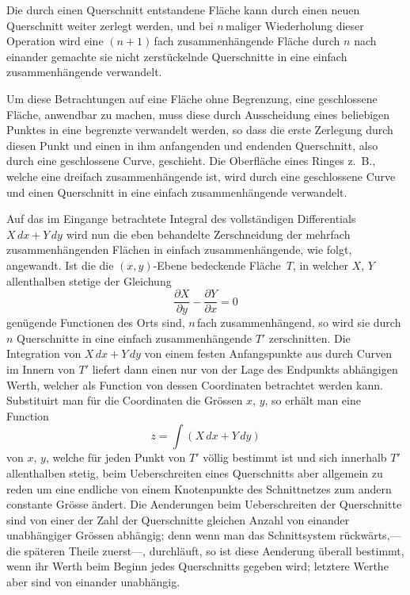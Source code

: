 \documentclass[a4paper,12pt,leqno]{article}
\begin{document}
Die durch einen Querschnitt entstandene Fl\"{a}che kann durch
einen neuen Querschnitt weiter zerlegt werden, und bei $n \,$\-maliger
Wiederholung dieser Operation wird eine ${(n + 1)} \,$\-fach
zusammenh\"{a}ngende Fl\"{a}che durch $n$ nach einander gemachte
sie nicht zerst\"{u}ckelnde Querschnitte in eine einfach
zusammenh\"{a}ngende verwandelt.

Um diese Betrachtungen auf eine Fl\"{a}che ohne Begrenzung, eine
geschlossene Fl\"{a}che, anwendbar zu machen, muss diese durch
Ausscheidung eines beliebigen Punktes in eine begrenzte
verwandelt werden, so dass die erste Zerlegung durch diesen Punkt
und einen in ihm anfangenden und endenden Querschnitt, also durch
eine geschlossene Curve, geschieht.  Die Oberfl\"{a}che eines
Ringes z.~B., welche eine dreifach zusammenh\"{a}ngende ist, wird
durch eine geschlossene Curve und einen Querschnitt in eine
einfach zusammenh\"{a}ngende verwandelt.

Auf das im Eingange betrachtete Integral des vollst\"{a}ndigen
Differentials $X \, dx + Y \, dy$ wird nun die eben behandelte
Zerschneidung der mehrfach zusammenh\"{a}ngenden Fl\"{a}chen in
einfach zusammenh\"{a}ngende, wie folgt, angewandt.  Ist die die
$(x, y)$-Ebene bedeckende Fl\"{a}che~$T$, in welcher $X$, $Y$
allenthalben stetige der Gleichung
\[ \frac{\partial X}{\partial y} - \frac{\partial Y}{\partial x}
   = 0 \]
gen\"{u}gende Functionen des Orts sind, $n \,$\-fach
zusammenh\"{a}ngend, so wird sie durch $n$ Querschnitte in eine
einfach zusammenh\"{a}ngende $T'$ zerschnitten.  Die Integration
von $X \, dx + Y \, dy$ von einem festen Anfangspunkte aus durch
Curven im Innern von $T'$ liefert dann einen nur von der Lage des
Endpunkts abh\"{a}ngigen Werth, welcher als Function von dessen
Coordinaten betrachtet werden kann.  Substituirt man f\"{u}r die
Coordinaten die Gr\"{o}ssen $x$, $y$, so erh\"{a}lt man eine
Function
\[ z = \int (X \, dx + Y \, dy) \]
von $x$, $y$, welche f\"{u}r jeden Punkt von $T'$ v\"{o}llig
bestimmt ist und sich innerhalb $T'$ allenthalben stetig, beim
Ueberschreiten eines Querschnitts aber allgemein zu reden um eine
endliche von einem Knotenpunkte des Schnittnetzes zum andern
constante Gr\"{o}sse \"{a}ndert.  Die Aenderungen beim
Ueberschreiten der Querschnitte sind von einer der Zahl der
Querschnitte gleichen Anzahl von einander unabh\"{a}ngiger
Gr\"{o}ssen abh\"{a}ngig; denn wenn man das Schnittsystem
r\"{u}ckw\"{a}rts,---die sp\"{a}teren Theile zuerst---,
durchl\"{a}uft, so ist diese Aenderung \"{u}berall bestimmt, wenn
ihr Werth beim Beginn jedes Querschnitts gegeben wird; letztere
Werthe aber sind von einander unabh\"{a}ngig.
\end{document}
